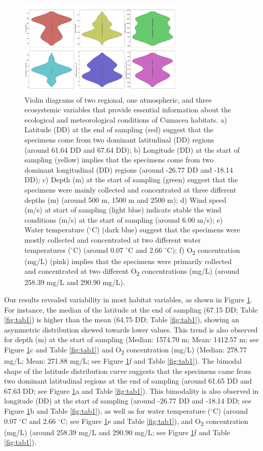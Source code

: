 {\begin{figure}[htbp]
    \centering
    \includegraphics[width=0.7\textwidth]{figure1.jpg}
    \caption{Violin diagrams of two regional, one atmospheric, and three ecosystemic variables that provide essential information about the ecological and meteorological conditions of Cumacea habitats. a) Latitude (DD) at the end of sampling (red) suggest that the specimens come from two dominant latitudinal (DD) regions (around 61.64 DD and 67.64 DD); b) Longitude (DD) at the start of sampling (yellow) implies that the specimens come from two dominant longitudinal (DD) regions (around -26.77 DD and -18.14 DD); c) Depth (m) at the start of sampling (green) suggest that the specimens were mainly collected and concentrated at three different depths (m) (around 500 m, 1500 m and 2500 m); d) Wind speed (m/s) at start of sampling (light blue) indicate stable the wind conditions (m/s) at the start of sampling (around 6.00 m/s); e) Water temperature ($^\circ$C) (dark blue) suggest that the specimens were mostly collected and concentrated at two different water temperatures ($^\circ$C) (around 0.07 $^\circ$C and 2.66 $^\circ$C); f) O\textsubscript{2} concentration (mg/L) (pink) implies that the specimens were primarily collected and concentrated at two different O\textsubscript{2} concentrations (mg/L) (around 258.39 mg/L and 290.90 mg/L). \label{fig:fig2}}
\end{figure}

Our results revealed variability in most habitat variables, as shown in Figure \ref{fig:fig2}. For instance, the median of the latitude at the end of sampling (67.15 DD; Table \ref{fig:tab1}) is higher than the mean (64.75 DD; Table \ref{fig:tab1}), showing an asymmetric distribution skewed towards lower values. This trend is also observed for depth (m) at the start of sampling (Median: 1574.70 m; Mean: 1412.57 m; see Figure \ref{fig:fig2}c and Table \ref{fig:tab1}) and O\textsubscript{2} concentration (mg/L) (Median: 278.77 mg/L; Mean: 271.88 mg/L; see Figure \ref{fig:fig2}f and Table \ref{fig:tab1}). The bimodal shape of the latitude distribution curve suggests that the specimens came from two dominant latitudinal regions at the end of sampling (around 61.65 DD and 67.63 DD; see Figure \ref{fig:fig2}a and Table \ref{fig:tab1}). This bimodality is also observed in longitude (DD) at the start of sampling (around -26.77 DD and -18.14 DD; see Figure \ref{fig:fig2}b and Table \ref{fig:tab1}), as well as for water temperature ($^\circ$C) (around 0.07 $^\circ$C and 2.66 $^\circ$C; see Figure \ref{fig:fig2}e and Table \ref{fig:tab1}), and O\textsubscript{2} concentration (mg/L) (around 258.39 mg/L and 290.90 mg/L; see Figure \ref{fig:fig2}f and Table \ref{fig:tab1}).

}
